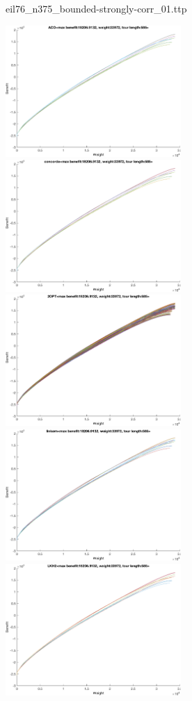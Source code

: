 \documentclass{article}
\begin{document}
\newpage
eil76\_n375\_bounded-strongly-corr\_01.ttp

\noindent
\includegraphics[width=0.5\textwidth]{eil76figs/eil76_n375_bounded-strongly-corr_01.ttp.aco.txt.eps}
\includegraphics[width=0.5\textwidth]{eil76figs/eil76_n375_bounded-strongly-corr_01.ttp.con.txt.eps}
\includegraphics[width=0.5\textwidth]{eil76figs/eil76_n375_bounded-strongly-corr_01.ttp.inv.txt.eps}
\includegraphics[width=0.5\textwidth]{eil76figs/eil76_n375_bounded-strongly-corr_01.ttp.lkh.txt.eps}
\includegraphics[width=0.5\textwidth]{eil76figs/eil76_n375_bounded-strongly-corr_01.ttp.lkh2.txt.eps}
\end{document}
